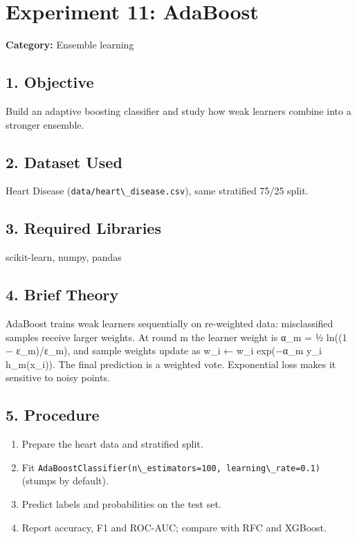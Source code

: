 \chapter{Experiment 11: AdaBoost}\label{experiment-11-adaboost}

\textbf{Category:} Ensemble learning

\section{1. Objective}\label{objective-3}

Build an adaptive boosting classifier and study how weak learners
combine into a stronger ensemble.

\section{2. Dataset Used}\label{dataset-used-3}

Heart Disease (\passthrough{\lstinline!data/heart\_disease.csv!}), same
stratified 75/25 split.

\section{3. Required Libraries}\label{required-libraries-3}

scikit-learn, numpy, pandas

\section{4. Brief Theory}\label{brief-theory-3}

AdaBoost trains weak learners sequentially on re-weighted data:
misclassified samples receive larger weights. At round m the learner
weight is α\_m = ½ ln((1 − ε\_m)/ε\_m), and sample weights update as
w\_i ← w\_i exp(−α\_m y\_i h\_m(x\_i)). The final prediction is a
weighted vote. Exponential loss makes it sensitive to noisy points.

\section{5. Procedure}\label{procedure-3}

\begin{enumerate}
\def\labelenumi{\arabic{enumi}.}
\tightlist
\item
  Prepare the heart data and stratified split.
\item
  Fit
  \passthrough{\lstinline!AdaBoostClassifier(n\_estimators=100, learning\_rate=0.1)!}
  (stumps by default).
\item
  Predict labels and probabilities on the test set.
\item
  Report accuracy, F1 and ROC-AUC; compare with RFC and XGBoost.
\end{enumerate}

